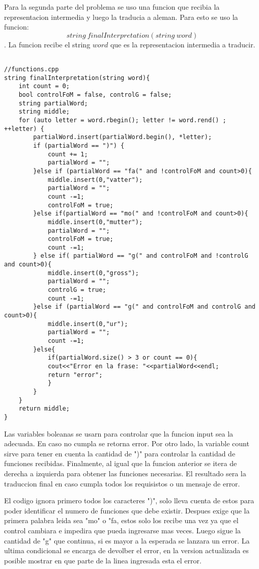 \documentclass[conference]{IEEEtran}
\begin{document}
Para la segunda parte del problema se uso una funcion que recibia la representacion intermedia y luego la traducia a aleman. Para esto se uso la funcion: 
$$string\  finalInterpretation(string\  word) $$
. La funcion recibe el string $word$ que es la representacion intermedia a traducir. 

\begin{lstlisting}
	
//functions.cpp
string finalInterpretation(string word){
	int count = 0;
	bool controlFoM = false, controlG = false;
	string partialWord;
	string middle;
	for (auto letter = word.rbegin(); letter != word.rend() ; ++letter) {
		partialWord.insert(partialWord.begin(), *letter);
		if (partialWord == ")") {
			count += 1;
			partialWord = "";
		}else if (partialWord == "fa(" and !controlFoM and count>0){
			middle.insert(0,"vatter");
			partialWord = "";
			count -=1;
			controlFoM = true;
		}else if(partialWord == "mo(" and !controlFoM and count>0){
			middle.insert(0,"mutter");
			partialWord = "";
			controlFoM = true;
			count -=1;
		} else if( partialWord == "g(" and controlFoM and !controlG and count>0){
			middle.insert(0,"gross");
			partialWord = "";
			controlG = true;
			count -=1;
		}else if (partialWord == "g(" and controlFoM and controlG and count>0){
			middle.insert(0,"ur");
			partialWord = "";
			count -=1;
		}else{
			if(partialWord.size() > 3 or count == 0){
			cout<<"Error en la frase: "<<partialWord<<endl;
			return "error";
			}
		}
	}
	return middle;
}

\end{lstlisting}

Las variables boleanas se usarn para controlar que la funcion input sea la adecuada. En caso no cumpla se retorna error. Por otro lado, la variable count sirve para tener en cuenta la cantidad de ")" para controlar la cantidad de funciones recibidas. Finalmente, al igual que la funcion anterior se itera de derecha a izquierda para obtener las funciones necesarias. El resultado sera la traduccion final en caso cumpla todos los requisistos o un mensaje de error.

El codigo ignora primero todos los caracteres ")", solo lleva cuenta de estos para poder identificar el numero de funciones que debe existir. Despues exige que la primera palabra leida sea "mo" o "fa, estos solo los recibe una vez ya que el control cambiara e impedira que pueda ingresarse mas veces. Luego sigue la cantidad de "g" que continua, si es mayor a la esperada se lanzara un error. La ultima condicional se encarga de devolber el error, en la version actualizada es posible mostrar en que parte de la linea ingresada esta el error. 
\end{document}
